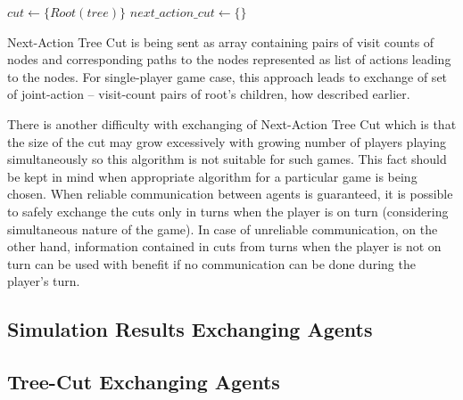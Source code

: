 \begin{algorithm}
\DontPrintSemicolon
\caption{$BuildNextActionTreeCut(tree, player)$\label{alg_next_action_tree_cut_construction}}
$cut \leftarrow \{Root(tree)\}$ \;
$next\_action\_cut \leftarrow \{\}$ \;
\end{algorithm}

Next-Action Tree Cut is being sent as array containing pairs of visit counts of nodes and
corresponding paths to the nodes represented as list of actions leading to the nodes. For
single-player game case, this approach leads to exchange of set of joint-action -- visit-count
pairs of root's children, how described earlier.

There is another difficulty with exchanging of Next-Action Tree Cut which is that the size of
the cut may grow excessively with growing number of players playing simultaneously so this 
algorithm is not suitable for such games. This fact should be kept in mind
when appropriate algorithm for a particular game is being chosen. When reliable communication
between agents is guaranteed, it is possible to safely exchange the cuts only in turns when the
player is on turn (considering simultaneous nature of the game). In case of unreliable
communication, on the other hand, information contained in cuts from turns when the player is
not on turn can be used with benefit if no communication can be done during the player's turn.


\subsection{Simulation Results Exchanging Agents}
\subsection{Tree-Cut Exchanging Agents}
